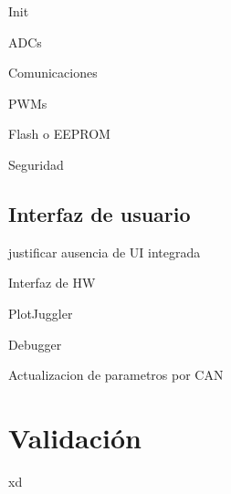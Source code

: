 Init

ADCs

Comunicaciones

PWMs

Flash o EEPROM

Seguridad

\subsection{Interfaz de usuario}

justificar ausencia de UI integrada

Interfaz de HW 

PlotJuggler

Debugger

Actualizacion de parametros por CAN

\section{Validación}
xd


